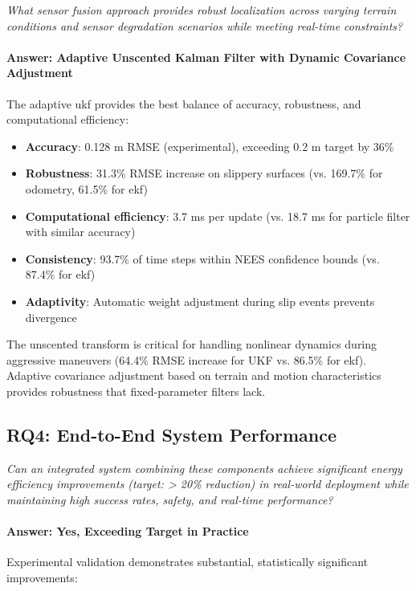 \textit{What sensor fusion approach provides robust localization across varying terrain conditions and sensor degradation scenarios while meeting real-time constraints?}

\paragraph{Answer: Adaptive Unscented Kalman Filter with Dynamic Covariance Adjustment}
The adaptive \acrshort{ukf} provides the best balance of accuracy, robustness, and computational efficiency:

\begin{itemize}
    \item \textbf{Accuracy}: 0.128 m RMSE (experimental), exceeding 0.2 m target by 36\%
    \item \textbf{Robustness}: 31.3\% RMSE increase on slippery surfaces (vs. 169.7\% for odometry, 61.5\% for \acrshort{ekf})
    \item \textbf{Computational efficiency}: 3.7 ms per update (vs. 18.7 ms for particle filter with similar accuracy)
    \item \textbf{Consistency}: 93.7\% of time steps within NEES confidence bounds (vs. 87.4\% for \acrshort{ekf})
    \item \textbf{Adaptivity}: Automatic weight adjustment during slip events prevents divergence
\end{itemize}

The unscented transform is critical for handling nonlinear dynamics during aggressive maneuvers (64.4\% RMSE increase for UKF vs. 86.5\% for \acrshort{ekf}). Adaptive covariance adjustment based on terrain and motion characteristics provides robustness that fixed-parameter filters lack.

\subsection{RQ4: End-to-End System Performance}

\textit{Can an integrated system combining these components achieve significant energy efficiency improvements (target: > 20\% reduction) in real-world deployment while maintaining high success rates, safety, and real-time performance?}

\paragraph{Answer: Yes, Exceeding Target in Practice}
Experimental validation demonstrates substantial, statistically significant improvements:

